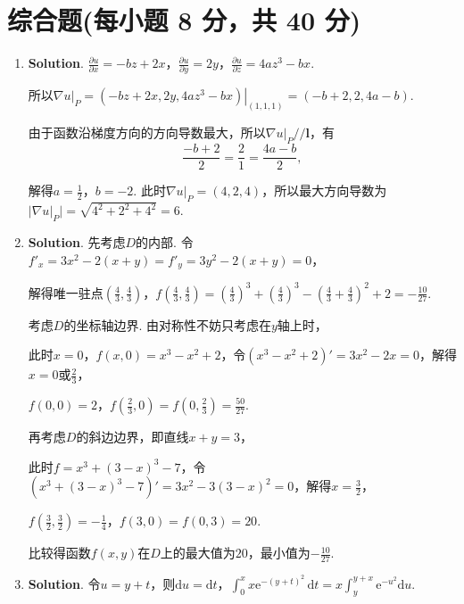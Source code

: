 \documentclass[../Main.tex]{subfiles}
\begin{document}
\section{综合题(每小题 8 分，共 40 分)}
\begin{enumerate}
    \item[11.] \textbf{Solution}. $\frac{\partial u}{\partial x}= -bz+2x$，$\frac{\partial
                  u}{\partial y}= 2y$，$\frac{\partial u}{\partial z}= 4az^{3}-bx$.

          所以$\nabla u|_{P}= \left.(-bz+2x,2y,4az^{3}-bx)\right|_{(1,1,1)}= (-b+2,2,
              4a-b)$.

          由于函数沿梯度方向的方向导数最大，所以$\nabla u|_{P}//\boldsymbol{l}$，有
          \[
              \frac{-b+2}{2}= \frac{2}{1}= \frac{4a-b}{2},
          \]

          解得$a=\frac{1}{2}$，$b=-2$. 此时$\nabla u|_{P}= (4,2,4)$，所以最大方向导数为$|
              \nabla u|_{P}| = \sqrt{4^{2}+2^{2}+4^{2}}= 6$.

    \item[12.] \textbf{Solution}. 先考虑$D$的内部. 令$f'_{x}= 3x^{2}-2(x+y) = f'_{y}
              = 3y^{2}-2(x+y) = 0$，

          解得唯一驻点$\left(\frac{4}{3},\frac{4}{3}\right)$，$f\left(\frac{4}{3},\frac{4}{3}
              \right)=\left(\frac{4}{3}\right)^{3}+\left(\frac{4}{3}\right)^{3}-\left(\frac{4}{3}
              +\frac{4}{3}\right)^{2}+ 2=-\frac{10}{27}$.

          考虑$D$的坐标轴边界. 由对称性不妨只考虑在$y$轴上时，

          此时$x=0$，$f(x,0) = x^{3}-x^{2}+2$，令$\left(x^{3}-x^{2}+2\right)'=3x^{2}-
              2x=0$，解得$x=0$或$\frac{2}{3}$，

          $f\left(0,0\right) = 2$，$f\left(\frac{2}{3},0\right) = f\left(0,\frac{2}{3}
              \right) = \frac{50}{27}$.

          再考虑$D$的斜边边界，即直线$x+y=3$，

          此时$f = x^{3}+(3-x)^{3}-7$，令$\left(x^{3}+(3-x)^{3}-7\right)' = 3x^{2}-3(
                  3-x)^{2}=0$，解得$x=\frac{3}{2}$，

          $f\left(\frac{3}{2},\frac{3}{2}\right) = -\frac{1}{4}$，$f(3,0)=f(0,3) = 20$.

          比较得函数$f(x,y)$在$D$上的最大值为$20$，最小值为$-\frac{10}{27}$.

    \item[13.] \textbf{Solution}. 令$u=y+t$，则$\mathrm{d}u = \mathrm{d}t$，$\int
              _{0}^{x}x\mathrm{e}^{-(y+t)^2}\,\mathrm{d}t = x\int_{y}^{y+x}\mathrm{e}^{-u^2}
              \mathrm{d}u$.


\end{enumerate}
\end{document}
